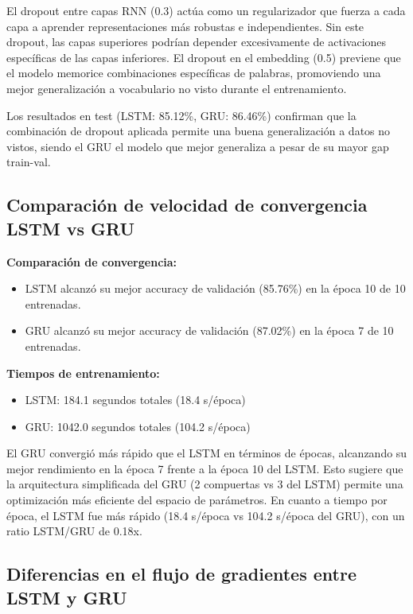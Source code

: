 El dropout entre capas RNN (0.3) actúa como un regularizador que fuerza a cada capa a aprender representaciones más robustas e independientes. Sin este dropout, las capas superiores podrían depender excesivamente de activaciones específicas de las capas inferiores. El dropout en el embedding (0.5) previene que el modelo memorice combinaciones específicas de palabras, promoviendo una mejor generalización a vocabulario no visto durante el entrenamiento.

Los resultados en test (LSTM: 85.12\%, GRU: 86.46\%) confirman que la combinación de dropout aplicada permite una buena generalización a datos no vistos, siendo el GRU el modelo que mejor generaliza a pesar de su mayor gap train-val.

\subsection{Comparación de velocidad de convergencia LSTM vs GRU}

\textbf{Comparación de convergencia:}
\begin{itemize}
    \item LSTM alcanzó su mejor accuracy de validación (85.76\%) en la época 10 de 10 entrenadas.
    \item GRU alcanzó su mejor accuracy de validación (87.02\%) en la época 7 de 10 entrenadas.
\end{itemize}

\textbf{Tiempos de entrenamiento:}
\begin{itemize}
    \item LSTM: 184.1 segundos totales (18.4 s/época)
    \item GRU: 1042.0 segundos totales (104.2 s/época)
\end{itemize}

El GRU convergió más rápido que el LSTM en términos de épocas, alcanzando su mejor rendimiento en la época 7 frente a la época 10 del LSTM. Esto sugiere que la arquitectura simplificada del GRU (2 compuertas vs 3 del LSTM) permite una optimización más eficiente del espacio de parámetros. En cuanto a tiempo por época, el LSTM fue más rápido (18.4 s/época vs 104.2 s/época del GRU), con un ratio LSTM/GRU de 0.18x.

\subsection{Diferencias en el flujo de gradientes entre LSTM y GRU}


